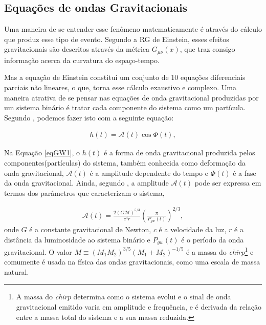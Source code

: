 \subsection{Equações de ondas Gravitacionais}
\label{subsec:ondas-gravitacionais:equacoes}

Uma maneira de se entender esse fenômeno matematicamente é através do cálculo que produz esse tipo de evento. Segundo a RG de Einstein, esses efeitos gravitacionais são descritos através da métrica $G_{\mu \nu}(x)$, que traz consigo informação acerca da curvatura do espaço-tempo.

Mas a equação de Einstein constitui um conjunto de 10 equações diferenciais parciais não lineares, o que, torna esse cálculo exaustivo e complexo. Uma maneira atrativa de se pensar nas equações de onda gravitacional produzidas por um sistema binário é tratar cada componente do sistema como um partícula. Segundo \cite{rubbo2007hands}, podemos fazer isto com a seguinte equação:

\begin{equation} \label{eqGW1}
\begin{split}
h(t) = \mathcal{A}(t)\cos \Phi(t),
\end{split}
\end{equation}

Na Equação \ref{eqGW1}, o $h(t)$ é a forma de onda gravitacional produzida pelos componentes(partículas) do sistema, também conhecida como deformação da onda gravitacional, $\mathcal{A}(t)$ é a amplitude dependente do tempo e $\Phi (t)$ é a fase da onda gravitacional. Ainda, segundo \cite{rubbo2007hands}, a amplitude $\mathcal{A}(t)$ pode ser expressa em termos dos parâmetros que caracterizam o sistema,

\begin{equation} \label{eqGW2}
\begin{split}
\mathcal{A}(t) = \frac{2(G\mathcal{M})^{5/3}}{c^4 r} \left(\frac{\pi}{P_{gw}(t)}\right)^{2/3} ,
\end{split}
\end{equation}
onde $G$ é a constante gravitacional de Newton, $c$ é a velocidade da luz, $r$ é a distância da luminosidade ao sistema binário e $P_{gw}(t)$ é o período da onda gravitacional. O valor $M \equiv (M_1 M_2)^{3/5}(M_1+M_2)^{-1/5}$ é a massa do \textit{chirp}\footnote{A massa do \textit{chirp} determina como o sistema evolui e o sinal de onda gravitacional emitido varia em amplitude e frequência, e é derivada da relação entre a massa total do sistema e a sua massa reduzida.} e comumente é usada na física das ondas gravitacionais, como uma escala de massa natural.


